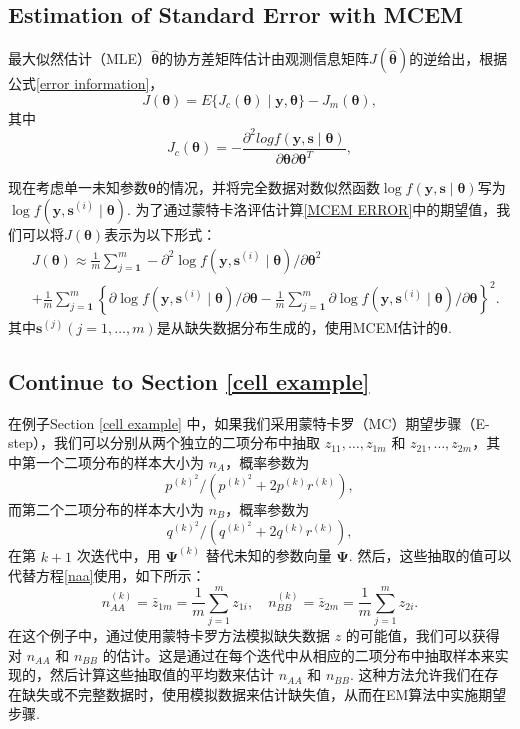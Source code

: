 \documentclass[UTF8,12pt]{ctexart}
\numberwithin{equation}{section}%
\begin{document}
	\subsection{Estimation of Standard Error with MCEM}
	最大似然估计（MLE）$\hat{\boldsymbol{\theta}}$的协方差矩阵估计由观测信息矩阵$J(\hat{\boldsymbol{\theta}})$的逆给出，根据公式\eqref{error information}，
	\begin{equation}\label{MCEM ERROR}
		J(\boldsymbol{\theta})	=E\{J_c(\boldsymbol{\theta}) \mid \mathbf{y}, \boldsymbol{\theta}\}-J_m(\boldsymbol{\theta}),
	\end{equation}
	其中
	$$
	J_c(\boldsymbol{\theta})=-\frac{\partial^2 log f(\mathbf{y}, \mathbf{s} \mid \boldsymbol{\theta})}{\partial \boldsymbol{\theta}\partial \boldsymbol{\theta}^T},
	$$
	
	现在考虑单一未知参数$\boldsymbol{\theta}$的情况，并将完全数据对数似然函数$\log f(\mathbf{y}, \mathbf{s} \mid \boldsymbol{\theta})$写为$\log f(\mathbf{y}, \mathbf{s}^{(i)} \mid \boldsymbol{\theta})$. 为了通过蒙特卡洛评估计算\eqref{MCEM ERROR}中的期望值，我们可以将$J(\boldsymbol{\theta})$表示为以下形式：
	$$
	\begin{aligned}
		& J(\boldsymbol{\theta}) \approx \frac{1}{m} \sum_{j=\mathbf{1}}^m-\partial^2 \log f(\mathbf{y}, \mathbf{s}^{(i)} \mid \boldsymbol{\theta}) / \partial \boldsymbol{\theta}^2 \\
		&+\frac{1}{m} \sum_{j=\mathbf{1}}^m\left\{\partial \log f(\mathbf{y}, \mathbf{s}^{(i)} \mid \boldsymbol{\theta}) / \partial \boldsymbol{\theta}-\frac{1}{m} \sum_{j=\mathbf{1}}^m \partial \log f(\mathbf{y}, \mathbf{s}^{(i)} \mid \boldsymbol{\theta}) / \partial \boldsymbol{\theta}\right\}^2.
	\end{aligned}
	$$
	其中$\mathbf{s}^{(j)}(j=1, \ldots, m)$是从缺失数据分布生成的，使用MCEM估计的$\boldsymbol{\theta}$.
	\subsection{Continue to Section \ref{cell example}}
	在例子Section \ref{cell example} 中，如果我们采用蒙特卡罗（MC）期望步骤（E-step），我们可以分别从两个独立的二项分布中抽取 \(z_{11}, \ldots, z_{1m}\) 和 \(z_{21}, \ldots, z_{2m}\)，其中第一个二项分布的样本大小为 \(n_A\)，概率参数为
	\[
	p^{(k)^2} /\left(p^{(k)^2}+2 p^{(k)} r^{(k)}\right),
	\]
	而第二个二项分布的样本大小为 \(n_B\)，概率参数为
	\[
	q^{(k)^2} /\left(q^{(k)^2}+2 q^{(k)} r^{(k)}\right),
	\]
	在第 \(k+1\) 次迭代中，用 \(\boldsymbol{\Psi}^{(k)}\) 替代未知的参数向量 \(\boldsymbol{\Psi}\). 然后，这些抽取的值可以代替方程\eqref{naa}使用，如下所示：
	\[
	n_{AA}^{(k)}=\bar{z}_{1m}=\frac{1}{m} \sum_{j=1}^m z_{1i}, \quad n_{BB}^{(k)}=\bar{z}_{2m}=\frac{1}{m} \sum_{j=1}^m z_{2i} .
	\]
	在这个例子中，通过使用蒙特卡罗方法模拟缺失数据 \(z\) 的可能值，我们可以获得对 \(n_{AA}\) 和 \(n_{BB}\) 的估计。这是通过在每个迭代中从相应的二项分布中抽取样本来实现的，然后计算这些抽取值的平均数来估计 \(n_{AA}\) 和 \(n_{BB}\). 这种方法允许我们在存在缺失或不完整数据时，使用模拟数据来估计缺失值，从而在EM算法中实施期望步骤.
	\newpage
	
\end{document}
